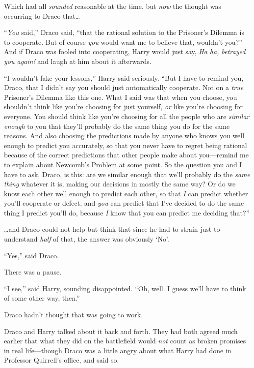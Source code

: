 Which had all \emph{sounded} reasonable at the time, but \emph{now} the thought was occurring to Draco that…

“\emph{You} said,” Draco said, “that the rational solution to the Prisoner’s Dilemma is to cooperate. But of course \emph{you} would want me to believe that, wouldn’t you?” And if Draco was fooled into cooperating, Harry would just say, \emph{Ha ha, betrayed you again!} and laugh at him about it afterwards.

“I wouldn’t fake your lessons,” Harry said seriously.
“But I have to remind you, Draco, that I didn’t say you should just automatically cooperate. Not on a \emph{true} Prisoner’s Dilemma like this one. What I said was that when you choose, you shouldn’t think like you’re choosing for just yourself, \emph{or} like you’re choosing for everyone. You should think like you’re choosing for all the people who are \emph{similar enough} to you that they’ll probably do the same thing you do for the same reasons. And also choosing the predictions made by anyone who knows you well enough to predict you accurately, so that you never have to regret being rational because of the correct predictions that other people make about you—remind me to explain about Newcomb’s Problem at some point. So the question you and I have to ask, Draco, is this: are we similar enough that we’ll probably do the \emph{same thing} whatever it is, making our decisions in mostly the same way? Or do we know each other well enough to predict each other, so that \emph{I} can predict whether you’ll cooperate or defect, and \emph{you} can predict that I’ve decided to do the same thing I predict you’ll do, because \emph{I} know that you can predict me deciding that?”

…and Draco could not help but think that since he had to strain just to understand \emph{half} of that, the answer was obviously ‘No’.

“Yes,” said Draco.

There was a pause.

“I see,” said Harry, sounding disappointed.
“Oh, well. I guess we’ll have to think of some other way, then.”

Draco hadn’t thought that was going to work.

Draco and Harry talked about it back and forth. They had both agreed much earlier that what they did on the battlefield would \emph{not} count as broken promises in real life—though Draco was a little angry about what Harry had done in Professor Quirrell’s office, and said so.

